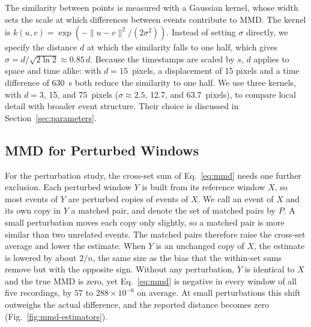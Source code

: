 The similarity between points is measured with a Gaussian kernel, whose width sets the scale at which differences between events contribute to MMD. The kernel is $k(u,v)=\exp\!\left(-\|u-v\|^2/(2\sigma^2)\right)$. Instead of setting $\sigma$ directly, we specify the distance $d$ at which the similarity falls to one half, which gives $\sigma = d/\sqrt{2\ln 2} \approx 0.85\,d$. Because the timestamps are scaled by $s$, $d$ applies to space and time alike: with $d = 15$~pixels, a displacement of 15 pixels and a time difference of 630~\textmu s both reduce the similarity to one half. We use three kernels, with $d = 3$, 15, and 75~pixels ($\sigma \approx 2.5$, 12.7, and 63.7~pixels), to compare local detail with broader event structure. Their choice is discussed in Section~\ref{sec:parameters}.

\subsection{MMD for Perturbed Windows}
\label{sec:mmd-perturbation}

For the perturbation study, the cross-set sum of Eq.~\eqref{eq:mmd} needs one further exclusion. Each perturbed window $Y$ is built from its reference window $X$, so most events of $Y$ are perturbed copies of events of $X$. We call an event of $X$ and its own copy in $Y$ a matched pair, and denote the set of matched pairs by $P$. A small perturbation moves each copy only slightly, so a matched pair is more similar than two unrelated events. The matched pairs therefore raise the cross-set average and lower the estimate. When $Y$ is an unchanged copy of $X$, the estimate is lowered by about $2/n$, the same size as the bias that the within-set sums remove but with the opposite sign. Without any perturbation, $Y$ is identical to $X$ and the true MMD is zero, yet Eq.~\eqref{eq:mmd} is negative in every window of all five recordings, by $57$ to $288\times10^{-6}$ on average. At small perturbations this shift outweighs the actual difference, and the reported distance becomes zero (Fig.~\ref{fig:mmd-estimators}).

